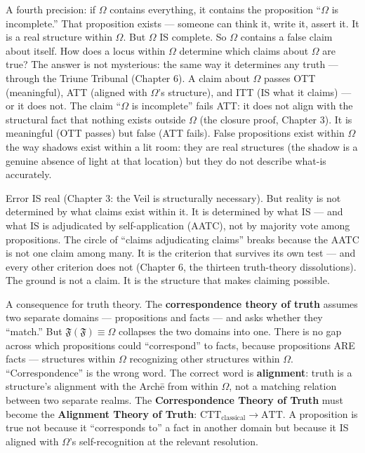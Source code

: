 \documentclass[10pt, openany, oneside]{book}
\begin{document}
A fourth precision: if $\Omega$ contains everything, it contains the proposition ``$\Omega$ is incomplete.'' That proposition exists --- someone can think it, write it, assert it. It is a real structure within $\Omega$. But $\Omega$ IS complete. So $\Omega$ contains a false claim about itself. How does a locus within $\Omega$ determine which claims about $\Omega$ are true? The answer is not mysterious: the same way it determines any truth --- through the Triune Tribunal (Chapter 6). A claim about $\Omega$ passes OTT (meaningful), ATT (aligned with $\Omega$'s structure), and ITT (IS what it claims) --- or it does not. The claim ``$\Omega$ is incomplete'' fails ATT: it does not align with the structural fact that nothing exists outside $\Omega$ (the closure proof, Chapter 3). It is meaningful (OTT passes) but false (ATT fails). False propositions exist within $\Omega$ the way shadows exist within a lit room: they are real structures (the shadow is a genuine absence of light at that location) but they do not describe what-is accurately.

Error IS real (Chapter 3: the Veil is structurally necessary). But reality is not determined by what claims exist within it. It is determined by what IS --- and what IS is adjudicated by self-application (AATC), not by majority vote among propositions. The circle of ``claims adjudicating claims'' breaks because the AATC is not one claim among many. It is the criterion that survives its own test --- and every other criterion does not (Chapter 6, the thirteen truth-theory dissolutions). The ground is not a claim. It is the structure that makes claiming possible.

A consequence for truth theory. The \textbf{correspondence theory of truth} assumes two separate domains --- propositions and facts --- and asks whether they ``match.'' But $\mathfrak{F}(\mathfrak{F}) \equiv \Omega$ collapses the two domains into one. There is no gap across which propositions could ``correspond'' to facts, because propositions ARE facts --- structures within $\Omega$ recognizing other structures within $\Omega$. ``Correspondence'' is the wrong word. The correct word is \textbf{alignment}: truth is a structure's alignment with the Arch\={e} from within $\Omega$, not a matching relation between two separate realms. The \textbf{Correspondence Theory of Truth} must become the \textbf{Alignment Theory of Truth}: $\text{CTT}_{\text{classical}} \to \text{ATT}$. A proposition is true not because it ``corresponds to'' a fact in another domain but because it IS aligned with $\Omega$'s self-recognition at the relevant resolution.
\end{document}
